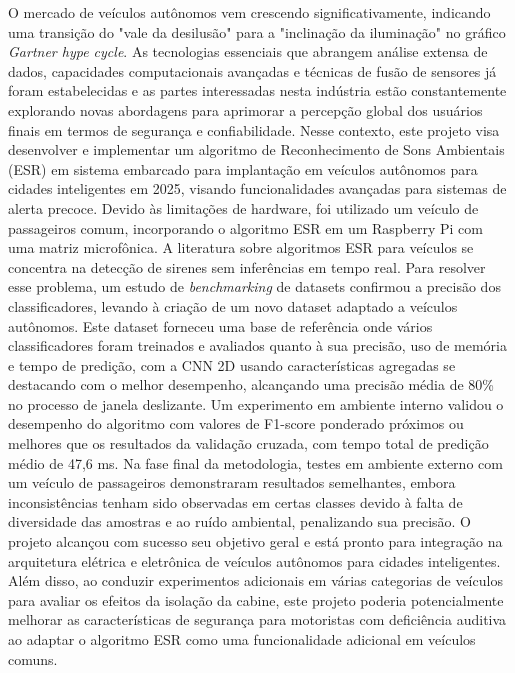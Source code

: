 \begin{resumo}

O mercado de veículos autônomos vem crescendo significativamente, indicando uma transição do "vale da desilusão" para a "inclinação da iluminação" no gráfico \textit{Gartner hype cycle}. As tecnologias essenciais que abrangem análise extensa de dados, capacidades computacionais avançadas e técnicas de fusão de sensores já foram estabelecidas e as partes interessadas nesta indústria estão constantemente explorando novas abordagens para aprimorar a percepção global dos usuários finais em termos de segurança e confiabilidade. Nesse contexto, este projeto visa desenvolver e implementar um algoritmo de Reconhecimento de Sons Ambientais (ESR) em sistema embarcado para implantação em veículos autônomos para cidades inteligentes em 2025, visando funcionalidades avançadas para sistemas de alerta precoce. Devido às limitações de hardware, foi utilizado um veículo de passageiros comum, incorporando o algoritmo ESR em um Raspberry Pi com uma matriz microfônica. A literatura sobre algoritmos ESR para veículos se concentra na detecção de sirenes sem inferências em tempo real. Para resolver esse problema, um estudo de \textit{benchmarking} de datasets confirmou a precisão dos classificadores, levando à criação de um novo dataset adaptado a veículos autônomos. Este dataset forneceu uma base de referência onde vários classificadores foram treinados e avaliados quanto à sua precisão, uso de memória e tempo de predição, com a CNN 2D usando características agregadas se destacando com o melhor desempenho, alcançando uma precisão média de 80\% no processo de janela deslizante. Um experimento em ambiente interno validou o desempenho do algoritmo com valores de F1-score ponderado próximos ou melhores que os resultados da validação cruzada, com tempo total de predição médio de 47,6 ms. Na fase final da metodologia, testes em ambiente externo com um veículo de passageiros demonstraram resultados semelhantes, embora inconsistências tenham sido observadas em certas classes devido à falta de diversidade das amostras e ao ruído ambiental, penalizando sua precisão. O projeto alcançou com sucesso seu objetivo geral e está pronto para integração na arquitetura elétrica e eletrônica de veículos autônomos para cidades inteligentes. Além disso, ao conduzir experimentos adicionais em várias categorias de veículos para avaliar os efeitos da isolação da cabine, este projeto poderia potencialmente melhorar as características de segurança para motoristas com deficiência auditiva ao adaptar o algoritmo ESR como uma funcionalidade adicional em veículos comuns.

\end{resumo}